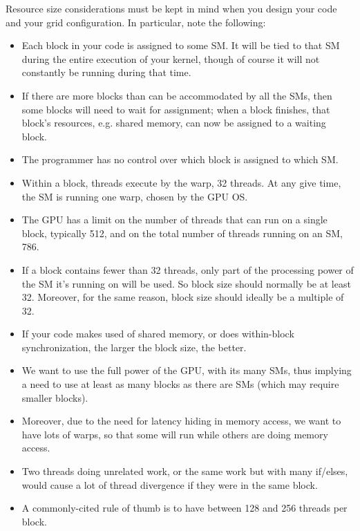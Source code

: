Resource size considerations must be kept in mind when you design your
code and your grid configuration.  In particular, note the following:

   \begin{itemize}

   \item Each block in your code is assigned to some SM.  It will be
   tied to that SM during the entire execution of your kernel, though of
   course it will not constantly be running during that time. 

   \item If there are more blocks than can be accommodated by all the
   SMs, then some blocks will need to wait for assignment; when a block
   finishes, that block's resources, e.g. shared memory, can now be
   assigned to a waiting block.

   \item The programmer has no control over which block is assigned to
   which SM.

   \item Within a block, threads execute by the warp, 32 threads.  At
   any give time, the SM is running one warp, chosen by the GPU OS.
   
   \item The GPU has a limit on the number of threads that can run on a
   single block, typically 512, and on the total number of threads running  
   on an SM, 786.

   \item If a block contains fewer than 32 threads, only part of the
   processing power of the SM it's running on will be used.  So block
   size should normally be at least 32.  Moreover, for the same reason,
   block size should ideally be a multiple of 32. 

   \item If your code makes used of shared memory, or does within-block
   synchronization, the larger the block size, the better.

   \item We want to use the full power of the GPU, with its many SMs,
   thus implying a need to use at least as many blocks as there are SMs
   (which may require smaller blocks).

   \item Moreover, due to the need for latency hiding in memory access,
   we want to have lots of warps, so that some will run while others
   are doing memory access.

   \item Two threads doing unrelated work, or the same work but with
   many if/elses, would cause a lot of thread divergence if they were in
   the same block.

   \item A commonly-cited rule of thumb is to have between 128 and 256
   threads per block.

   \end{itemize}


